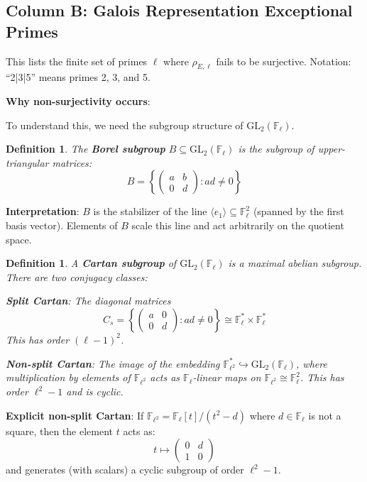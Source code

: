 \documentclass[11pt]{article}
\newtheorem{definition}[theorem]{Definition}
\begin{document}
\subsection{Column B: Galois Representation Exceptional Primes}

This lists the finite set of primes $\ell$ where $\rho_{E,\ell}$ fails to be surjective. Notation: ``2|3|5'' means primes 2, 3, and 5.

\textbf{Why non-surjectivity occurs}:

To understand this, we need the subgroup structure of $\text{GL}_2(\mathbb{F}_\ell)$.

\begin{definition}
The \textbf{Borel subgroup} $B \subseteq \text{GL}_2(\mathbb{F}_\ell)$ is the subgroup of upper-triangular matrices:
$$B = \left\{ \begin{pmatrix} a & b \\ 0 & d \end{pmatrix} : ad \neq 0 \right\}$$
\end{definition}

\textbf{Interpretation}: $B$ is the stabilizer of the line $\langle e_1 \rangle \subseteq \mathbb{F}_\ell^2$ (spanned by the first basis vector). Elements of $B$ scale this line and act arbitrarily on the quotient space.

\begin{definition}
A \textbf{Cartan subgroup} of $\text{GL}_2(\mathbb{F}_\ell)$ is a maximal abelian subgroup. There are two conjugacy classes:

\textbf{Split Cartan}: The diagonal matrices
$$C_s = \left\{ \begin{pmatrix} a & 0 \\ 0 & d \end{pmatrix} : ad \neq 0 \right\} \cong \mathbb{F}_\ell^* \times \mathbb{F}_\ell^*$$
This has order $(\ell-1)^2$.

\textbf{Non-split Cartan}: The image of the embedding $\mathbb{F}_{\ell^2}^* \hookrightarrow \text{GL}_2(\mathbb{F}_\ell)$, where multiplication by elements of $\mathbb{F}_{\ell^2}$ acts as $\mathbb{F}_\ell$-linear maps on $\mathbb{F}_{\ell^2} \cong \mathbb{F}_\ell^2$. This has order $\ell^2 - 1$ and is cyclic.
\end{definition}

\textbf{Explicit non-split Cartan}: If $\mathbb{F}_{\ell^2} = \mathbb{F}_\ell[t]/(t^2 - d)$ where $d \in \mathbb{F}_\ell$ is not a square, then the element $t$ acts as:
$$t \mapsto \begin{pmatrix} 0 & d \\ 1 & 0 \end{pmatrix}$$
and generates (with scalars) a cyclic subgroup of order $\ell^2-1$.
\end{document}
